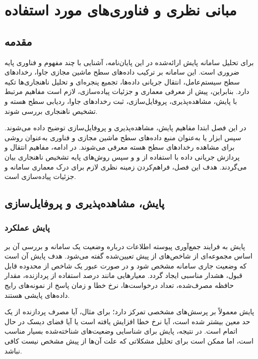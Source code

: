 \chapter{مبانی نظری و فناوری‌های مورد استفاده}
\label{chap:theoretical-background}

\section{مقدمه}
\label{sec:chapter2-introduction}

برای تحلیل سامانه پایش ارائه‌شده در این پایان‌نامه، آشنایی با چند مفهوم
و فناوری پایه ضروری است. این سامانه بر ترکیب داده‌های سطح ماشین مجازی
جاوا، رخدادهای سطح سیستم‌عامل، انتقال جریانی داده‌ها، تجمیع پنجره‌ای و
تحلیل ناهنجاری‌ها تکیه دارد. بنابراین، پیش از معرفی معماری و جزئیات
پیاده‌سازی، لازم است مفاهیم مرتبط با پایش، مشاهده‌پذیری، پروفایل‌سازی،
ثبت رخدادهای جاوا، ردیابی سطح هسته و تشخیص ناهنجاری بررسی
شوند.

در این فصل ابتدا مفاهیم پایش، مشاهده‌پذیری و پروفایل‌سازی توضیح داده
می‌شوند. سپس ابزار  یا  به‌عنوان منبع داده‌های
سطح ماشین مجازی و فناوری  به‌عنوان روشی برای مشاهده رخدادهای
سطح هسته معرفی می‌شوند. در ادامه، مفاهیم انتقال و پردازش جریانی داده با استفاده از
 و  و سپس روش‌های پایه تشخیص
ناهنجاری بیان می‌گردند. هدف این فصل، فراهم‌کردن زمینه نظری لازم برای
درک معماری سامانه و جزئیات پیاده‌سازی است.

\section{پایش، مشاهده‌پذیری و پروفایل‌سازی}
\label{sec:monitoring-observability-profiling}

\subsection{پایش عملکرد}

پایش به فرایند جمع‌آوری پیوسته اطلاعات درباره وضعیت یک
سامانه و بررسی آن بر اساس مجموعه‌ای از شاخص‌های از پیش تعیین‌شده گفته می‌شود.
هدف پایش آن است که وضعیت جاری سامانه مشخص شود و در صورت عبور یک شاخص از محدوده
قابل قبول، هشدار مناسبی ایجاد گردد. معیارهایی مانند درصد استفاده از پردازنده،
مقدار حافظه مصرف‌شده، تعداد درخواست‌ها، نرخ خطا و زمان پاسخ از نمونه‌های رایج
داده‌های پایشی هستند.

پایش معمولاً بر پرسش‌های مشخصی تمرکز دارد؛ برای مثال، آیا مصرف پردازنده از یک
حد معین بیشتر شده است، آیا نرخ خطا افزایش یافته است یا آیا فضای دیسک در حال
اتمام است. در نتیجه، پایش برای شناسایی وضعیت‌های شناخته‌شده بسیار مناسب است،
اما ممکن است برای تحلیل مشکلاتی که علت آن‌ها از پیش مشخص نیست کافی نباشد.

